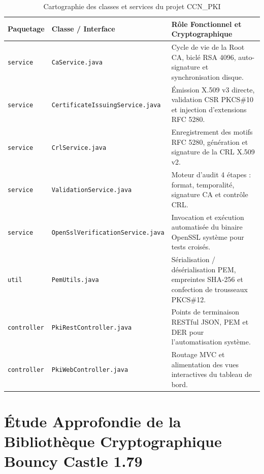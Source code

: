 \documentclass[12pt,a4paper]{report}
\begin{document}
\begin{table}[H]
\centering
\small
\begin{tabularx}{\textwidth}{l p{5.5cm} X}
\toprule
\textbf{Paquetage} & \textbf{Classe / Interface} & \textbf{Rôle Fonctionnel et Cryptographique} \\
\midrule
\texttt{service} & \texttt{CaService.java} & Cycle de vie de la Root CA, biclé RSA 4096, auto-signature et synchronisation disque. \\
\addlinespace
\texttt{service} & \texttt{CertificateIssuingService.java} & Émission X.509 v3 directe, validation CSR PKCS\#10 et injection d'extensions RFC 5280. \\
\addlinespace
\texttt{service} & \texttt{CrlService.java} & Enregistrement des motifs RFC 5280, génération et signature de la CRL X.509 v2. \\
\addlinespace
\texttt{service} & \texttt{ValidationService.java} & Moteur d'audit 4 étapes : format, temporalité, signature CA et contrôle CRL. \\
\addlinespace
\texttt{service} & \texttt{OpenSslVerificationService.java} & Invocation et exécution automatisée du binaire OpenSSL système pour tests croisés. \\
\addlinespace
\texttt{util} & \texttt{PemUtils.java} & Sérialisation / désérialisation PEM, empreintes SHA-256 et confection de trousseaux PKCS\#12. \\
\addlinespace
\texttt{controller} & \texttt{PkiRestController.java} & Points de terminaison RESTful JSON, PEM et DER pour l'automatisation système. \\
\addlinespace
\texttt{controller} & \texttt{PkiWebController.java} & Routage MVC et alimentation des vues interactives du tableau de bord. \\
\bottomrule
\end{tabularx}
\caption{Cartographie des classes et services du projet CCN\_PKI}
\label{tab:classes_projet}
\end{table}

\section{Étude Approfondie de la Bibliothèque Cryptographique Bouncy Castle 1.79}
\end{document}
